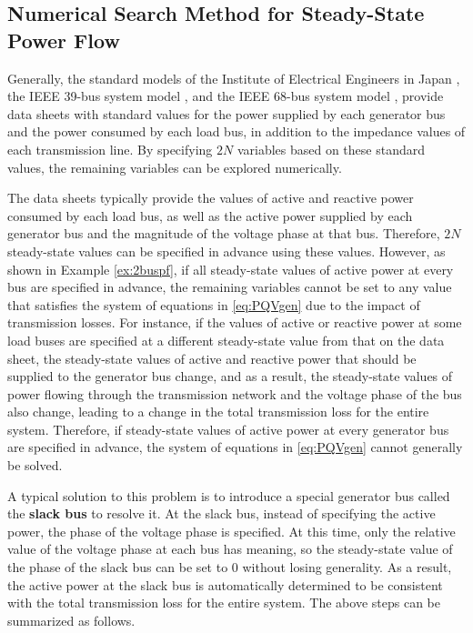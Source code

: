 \documentclass[graybox, envcountchap]{svmult}
\begin{document}
\subsection{Numerical Search Method for Steady-State Power Flow}

Generally, the standard models of the Institute of Electrical Engineers in Japan
\cite{ieejstandardmodel}, the IEEE 39-bus system model
\cite{athay1979practical}, and the IEEE 68-bus system model
\cite{singh2013ieee}, provide data sheets with standard values for the power
supplied by each generator bus and the power consumed by each load bus, in
addition to the impedance values of each transmission line. By specifying $2N$
variables based on these standard values, the remaining variables can be
explored numerically.

The data sheets typically provide the values of active and reactive power
consumed by each load bus, as well as the active power supplied by each
generator bus and the magnitude of the voltage phase at that bus. Therefore,
$2N$ steady-state values can be specified in advance using these values.
However, as shown in Example \ref{ex:2buspf}, if all steady-state values of
active power at every bus are specified in advance, the remaining variables
cannot be set to any value that satisfies the system of equations in
\ref{eq:PQVgen} due to the impact of transmission losses. For instance, if the
values of active or reactive power at some load buses are specified at a
different steady-state value from that on the data sheet, the steady-state
values of active and reactive power that should be supplied to the generator bus
change, and as a result, the steady-state values of power flowing through the
transmission network and the voltage phase of the bus also change, leading to a
change in the total transmission loss for the entire system. Therefore, if
steady-state values of active power at every generator bus are specified in
advance, the system of equations in \ref{eq:PQVgen} cannot generally be solved.

A typical solution to this problem is to introduce a special generator bus
called the \textbf{slack bus}  to resolve it. At the slack bus,
instead of specifying the active power, the phase of the voltage phase is
specified. At this time, only the relative value of the voltage phase at each
bus has meaning, so the steady-state value of the phase of the slack bus can be
set to 0 without losing generality. As a result, the active power at the slack
bus is automatically determined to be consistent with the total transmission
loss for the entire system. The above steps can be summarized as follows.
\end{document}
